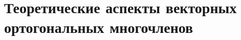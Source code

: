 \documentclass{report}
\begin{document}
\section{Теоретические аспекты векторных ортогональных многочленов}




\end{document}
